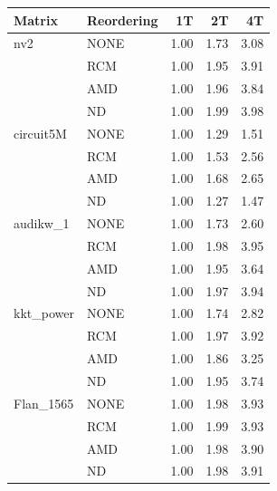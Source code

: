 \begin{table}[htbp]
  \centering
  \label{tab:scaling_arm}
  \begin{tabular}{llrrr}
    \toprule
    \textbf{Matrix} & \textbf{Reordering} & \textbf{1T} & \textbf{2T} & \textbf{4T} \\
    \midrule
    nv2 & NONE & 1.00 & 1.73 & 3.08 \\
     & RCM & 1.00 & 1.95 & 3.91 \\
     & AMD & 1.00 & 1.96 & 3.84 \\
     & ND & 1.00 & 1.99 & 3.98 \\
    \midrule
    circuit5M & NONE & 1.00 & 1.29 & 1.51 \\
     & RCM & 1.00 & 1.53 & 2.56 \\
     & AMD & 1.00 & 1.68 & 2.65 \\
     & ND & 1.00 & 1.27 & 1.47 \\
    \midrule
    audikw\_1 & NONE & 1.00 & 1.73 & 2.60 \\
     & RCM & 1.00 & 1.98 & 3.95 \\
     & AMD & 1.00 & 1.95 & 3.64 \\
     & ND & 1.00 & 1.97 & 3.94 \\
    \midrule
    kkt\_power & NONE & 1.00 & 1.74 & 2.82 \\
     & RCM & 1.00 & 1.97 & 3.92 \\
     & AMD & 1.00 & 1.86 & 3.25 \\
     & ND & 1.00 & 1.95 & 3.74 \\
    \midrule
    Flan\_1565 & NONE & 1.00 & 1.98 & 3.93 \\
     & RCM & 1.00 & 1.99 & 3.93 \\
     & AMD & 1.00 & 1.98 & 3.90 \\
     & ND & 1.00 & 1.98 & 3.91 \\
    \bottomrule
  \end{tabular}
\end{table}